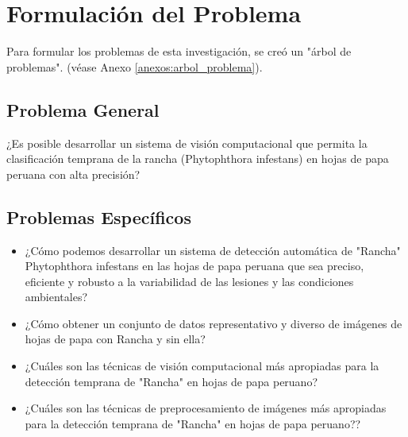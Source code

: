 

\section{Formulación del Problema}
Para formular los problemas de esta investigación, se creó un "árbol de problemas". (véase Anexo \ref{anexos:arbol_problema}).
\subsection{Problema General}
\newcommand{\ProblemaGeneral}{
	¿Es posible desarrollar un sistema de visión computacional que permita la clasificación temprana de la rancha (Phytophthora infestans) en hojas de papa peruana con alta precisión?
}

\ProblemaGeneral
\subsection{Problemas Espec\'{i}ficos}
\newcommand{\Pbone}{
	¿Cómo podemos desarrollar un sistema de detección automática de "Rancha" Phytophthora infestans en las hojas de papa peruana que sea preciso, eficiente y robusto a la variabilidad de las lesiones y las condiciones ambientales?
	
}

\newcommand{\Pbtwo}{
	¿Cómo obtener un conjunto de datos representativo y diverso de imágenes de hojas de papa con Rancha y sin ella?
}

\newcommand{\Pbthree}{
¿Cuáles son las técnicas de visión computacional más apropiadas para la detección temprana de "Rancha" en hojas de papa peruano?
}

\newcommand{\Pbfour}{
¿Cuáles son las técnicas de preprocesamiento de imágenes más apropiadas para la detección temprana de "Rancha" en hojas de papa peruano??
}

\begin{itemize}
	\item \Pbone
	\item \Pbtwo
	\item \Pbthree
	\item \Pbfour
\end{itemize}

